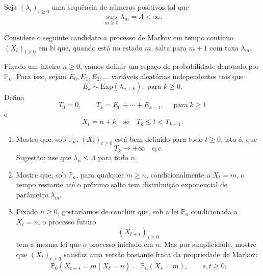 \documentclass{article}
\newcommand*\1{\mathds{1}}
\begin{document}
\pagebreak

 Seja $(\lambda_i)_{i \ge 0}$ uma sequência de números positivos tal que
\begin{equation}
\sup_{m \ge 0} \lambda_m = \Lambda < \infty.
\end{equation}

Considere o seguinte candidato a processo de Markov em tempo contínuo $(X_t)_{t \ge 0}$ em $\mathbb N$ que, quando está no estado $m$, salta para $m + 1$ com taxa $\lambda_m$.

Fixado um inteiro $n \geq 0$, vamos definir um espaço de probabilidade denotado por $\mathbb{P}_n$.
Para isso, sejam $E_0, E_1, E_2, \dots$ variáveis aleatórias independentes tais que
\begin{equation}
  E_k \sim \mathrm{Exp}(\lambda_{n + k}), \text{ para $k \geq 0$}.
\end{equation}
Defina
\begin{equation}
  T_0 = 0,
  \qquad
  T_k = E_0 + \cdots + E_{k - 1}, \quad \text{ para $k \ge 1$}
\end{equation}
e
\begin{equation}
  X_t = n + k
  \quad
  \text{se}
  \quad
  T_k\le t<T_{k+1}.
\end{equation}

\begin{enumerate}[\quad a)]
\item Mostre que, sob $\mathbb{P}_n$, $(X_t)_{t \ge 0}$ está bem definido para todo $t \ge 0$, isto é, que
  \begin{equation}
    T_k\to+\infty
    \quad
    \text{q.c.}
  \end{equation}
  Sugestão: use que $\lambda_n\le \Lambda$ para todo $n$.

\item Mostre que, sob $\mathbb{P}_n$, para qualquer $m \geq n$, condicionalmente a $X_t = m$, o tempo restante até o próximo salto tem distribuição exponencial de parâmetro $\lambda_m$.

\item Fixado $n \geq 0$, gostaríamos de concluir que, sob a lei $\mathbb{P}_0$ condicionada a $X_t = n$, o processo futuro
  \begin{equation}
    (X_{t + s})_{s \ge 0}
  \end{equation}
  tem a mesma lei que o processo iniciado em $n$.
  Mas por simplicidade, mostre que $(X_t)_{t\ge 0}$ satisfaz uma versão bastante fraca da propriedade de Markov:
  \begin{equation}
    \mathbb P_0(X_{t + s} = m \mid X_t = n)
    =
    \mathbb P_n(X_s = m),
    \qquad s, t \ge 0.
  \end{equation}
\end{enumerate}
\end{document}
